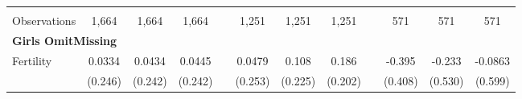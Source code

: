 \begin{landscape}
\begin{table}[htpb!]
\begin{center}
\begin{tabular}{lcccp{2mm}cccp{2mm}ccc}
\begin{footnotesize}\end{footnotesize}&\begin{footnotesize}\end{footnotesize}&\begin{footnotesize}\end{footnotesize}&\begin{footnotesize}\end{footnotesize}&\begin{footnotesize}\end{footnotesize}&\begin{footnotesize}\end{footnotesize}&\begin{footnotesize}\end{footnotesize}&\begin{footnotesize}\end{footnotesize}&\begin{footnotesize}\end{footnotesize}&\begin{footnotesize}\end{footnotesize}&\begin{footnotesize}\end{footnotesize}&\begin{footnotesize}\end{footnotesize}\\Observations&1,664&1,664&1,664&&1,251&1,251&1,251&&571&571&571\\
\multicolumn{12}{l}{\textbf{Girls OmitMissing}}\\ 
Fertility&0.0334&0.0434&0.0445&&0.0479&0.108&0.186&&-0.395&-0.233&-0.0863\\
&(0.246)&(0.242)&(0.242)&&(0.253)&(0.225)&(0.202)&&(0.408)&(0.530)&(0.599)\\

\end{tabular}
\end{center}
\end{table}
\end{landscape}
